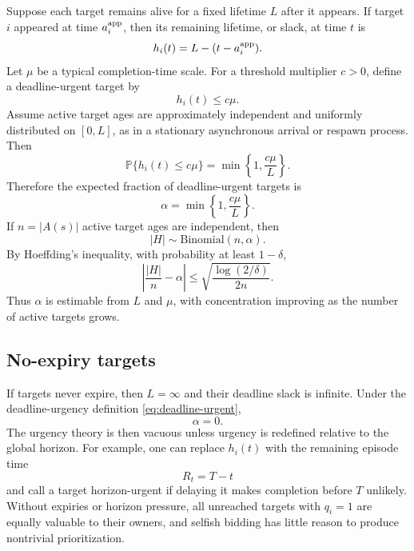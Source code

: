 \documentclass[11pt]{article}
\newcommand{\Prb}{\mathbb{P}}
\begin{document}
Suppose each target remains alive for a fixed lifetime $L$ after it appears. If target $i$ appeared at time $a_i^{\rm app}$,
then its remaining lifetime, or slack, at time $t$ is
\begin{equation}
  h_i(t)=L-(t-a_i^{\rm app}).
  \label{eq:slack-def}
\end{equation}
Let $\mu$ be a typical completion-time scale. For a threshold multiplier $c>0$, define a deadline-urgent target by
\begin{equation}
  h_i(t)\le c\mu.
  \label{eq:deadline-urgent}
\end{equation}
Assume active target ages are approximately independent and uniformly distributed on $[0,L]$, as in a stationary
asynchronous arrival or respawn process. Then
\begin{equation}
  \Prb\{h_i(t)\le c\mu\}
  =
  \min\left\{1,\frac{c\mu}{L}\right\}.
  \label{eq:alpha-fixed-lifetime}
\end{equation}
Therefore the expected fraction of deadline-urgent targets is
\begin{equation}
  \alpha
  =
  \min\left\{1,\frac{c\mu}{L}\right\}.
  \label{eq:alpha-final}
\end{equation}
If $n=|A(s)|$ active target ages are independent, then
\begin{equation}
  |H|\sim \mathrm{Binomial}(n,\alpha).
  \label{eq:binomial-H}
\end{equation}
By Hoeffding's inequality, with probability at least $1-\delta$,
\begin{equation}
  \left|\frac{|H|}{n}-\alpha\right|
  \le
  \sqrt{\frac{\log(2/\delta)}{2n}}.
  \label{eq:hoeffding-alpha}
\end{equation}
Thus $\alpha$ is estimable from $L$ and $\mu$, with concentration improving as the number of active targets grows.

\subsection{No-expiry targets}

If targets never expire, then $L=\infty$ and their deadline slack is infinite. Under the deadline-urgency definition
\eqref{eq:deadline-urgent},
\begin{equation}
  \alpha = 0.
  \label{eq:no-expiry-alpha}
\end{equation}
The urgency theory is then vacuous unless urgency is redefined relative to the global horizon. For example, one can
replace $h_i(t)$ with the remaining episode time
\begin{equation}
  R_t=T-t
  \label{eq:remaining-horizon}
\end{equation}
and call a target horizon-urgent if delaying it makes completion before $T$ unlikely. Without expiries or horizon
pressure, all unreached targets with $q_i=1$ are equally valuable to their owners, and selfish bidding has little
reason to produce nontrivial prioritization.
\end{document}
